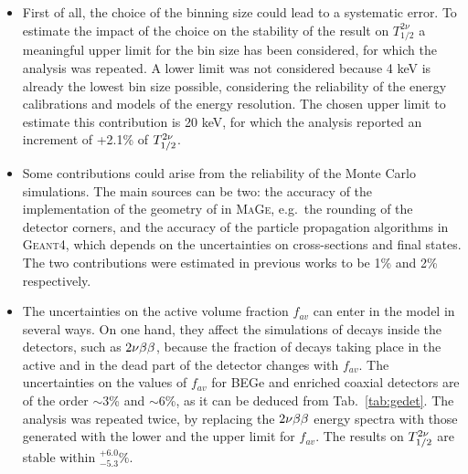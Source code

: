 \begin{itemize}
	\item First of all, the choice of the binning size could lead to a systematic error. To estimate the impact of the choice on the stability of the result on $T_{1/2}^{2\nu}$ a meaningful upper limit for the bin size has been considered, for which the analysis was repeated. A lower limit was not considered because 4 keV is already the lowest bin size possible, considering the reliability of the energy calibrations and models of the energy resolution. The chosen upper limit to estimate this contribution is 20 keV, for which the analysis reported an increment of +2.1\% of $T_{1/2}^{2\nu}$.
	\item Some contributions could arise from the reliability of the Monte Carlo simulations. The main sources can be two: the accuracy of the implementation of the geometry of {\gerda} in \textsc{MaGe}, e.g.~the rounding of the detector corners, and the accuracy of the particle propagation algorithms in \textsc{Geant4}, which depends on the uncertainties on cross-sections and final states. The two contributions were estimated in previous works to be 1\% \cite{gerda2nbb} and 2\% \cite{geant4sys1, geant4sys2, geant4sys3} respectively.
	\item The uncertainties on the active volume fraction $f_{av}$ can enter in the model in several ways. On one hand, they affect the simulations of decays inside the detectors, such as $2\nu\beta\beta$, because the fraction of decays taking place in the active and in the dead part of the detector changes with $f_{av}$. The uncertainties on the values of $f_{av}$ for BEGe and enriched coaxial detectors are of the order $\sim$3\% and $\sim$6\%, as it can be deduced from Tab.~\ref{tab:gedet}. The analysis was repeated twice, by replacing the $2\nu\beta\beta$ energy spectra with those generated with the lower and the upper limit for $f_{av}$. The results on $T_{1/2}^{2\nu}$ are stable within $^{+6.0}_{-5.3}\%$.


\end{itemize}
